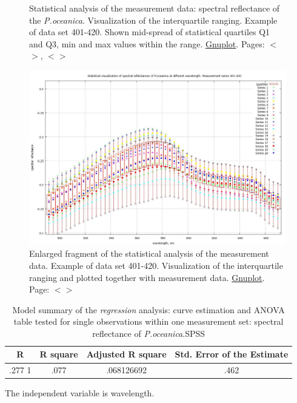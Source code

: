 \documentclass[11pt]{article}
\begin{document}
\begin{appendices}
\begin{figure}[H]
\begin{center}
		\caption{Statistical analysis of the measurement data: spectral reflectance of the \textit{P.oceanica}. 
		Visualization of the interquartile ranging. Example of data set 401-420. Shown mid-spread of  statistical quartiles Q1 and Q3, min and max values within the range. \href{http://www.gnuplot.info/}{Gnuplot}. Pages: $<$\pageref{page-21}$>$, $<$\pageref{page-31}$>$}
		\label{fig:A.13}
	\end{center}
\end{figure}
\begin{figure}[H]
	\begin{center}
		\includegraphics[scale=0.25]{GNU-enlarged-M-401-420.jpg}
		\caption{Enlarged fragment of the statistical analysis of the measurement data. Example of data set 401-420. 
		Visualization of the interquartile ranging and plotted together with measurement data. \href{http://www.gnuplot.info/}{Gnuplot}. Page: $<$\pageref{page-31}$>$}
		\label{fig:A.14}
	\end{center}
\end{figure}
\pagebreak

\begin{table}[htbp]
	\caption{Model summary of the \textit{regression} analysis: curve estimation and ANOVA table tested for single observations within one measurement set: spectral reflectance of \textit{P.oceanica}.\ac{SPSS}}
	\begin{center}
		\begin{tabular}{|c|c|c|c|}
			\hline\hline
			\textbf{R} & \textbf{R square} & \textbf{Adjusted R square} & \textbf{Std. Error of the Estimate} \\ \hline\hline
			.277 1 & .077 & .068126692 & .462 \\ \hline
		\end{tabular}
	\end{center}
	The independent variable is wavelength. 
	\label{tab:5}
\end{table}


\end{appendices}
\end{document}
